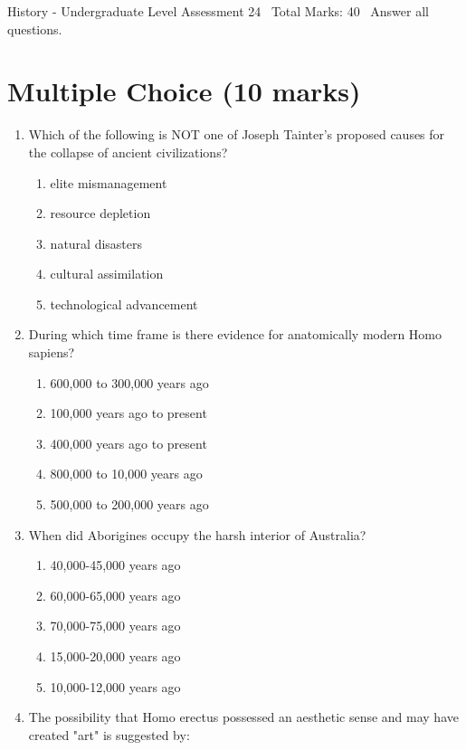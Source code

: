 \documentclass[12pt]{article}
\begin{document}
\begin{center}
History - Undergraduate Level Assessment 24 \
Total Marks: 40 \
Answer all questions.
\end{center}

\section*{Multiple Choice (10 marks)}
\begin{enumerate}[label=\arabic*.]
\item Which of the following is NOT one of Joseph Tainter's proposed causes for the collapse of ancient civilizations?
\begin{enumerate}[label=(\alph*)]
    \item elite mismanagement
    \item resource depletion
    \item natural disasters
    \item cultural assimilation
    \item technological advancement
\end{enumerate}
\item During which time frame is there evidence for anatomically modern Homo sapiens?
\begin{enumerate}[label=(\alph*)]
    \item 600,000 to 300,000 years ago
    \item 100,000 years ago to present
    \item 400,000 years ago to present
    \item 800,000 to 10,000 years ago
    \item 500,000 to 200,000 years ago
\end{enumerate}
\item When did Aborigines occupy the harsh interior of Australia?
\begin{enumerate}[label=(\alph*)]
    \item 40,000-45,000 years ago
    \item 60,000-65,000 years ago
    \item 70,000-75,000 years ago
    \item 15,000-20,000 years ago
    \item 10,000-12,000 years ago
\end{enumerate}
\item The possibility that Homo erectus possessed an aesthetic sense and may have created "art" is suggested by:
\begin{enumerate}[label=(\alph*)]

\end{enumerate}
\end{enumerate}
\end{document}
